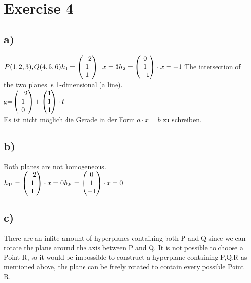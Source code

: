 \documentclass[a4paper,10pt]{article}
\begin{document}
\section*{Exercise 4}
\subsection*{a)} 
$P(1,2,3),Q(4,5,6) \\ \\
h_1=  \begin{pmatrix}-2\\1\\1 \end{pmatrix} \cdot x=3 \\\\
h_2=  \begin{pmatrix}0\\1\\-1 \end{pmatrix} \cdot x=-1 \\
$
The intersection of the two planes is 1-dimensional (a line). \\
g=$   \begin{pmatrix}-2\\1\\0 \end{pmatrix} + \begin{pmatrix}1\\1\\1 \end{pmatrix}  \cdot t \\$ \\
Es ist nicht möglich die Gerade in der Form $a\cdot x =b$ zu schreiben.
\subsection*{b)}
Both planes are not homogeneous. \\
$h_{1'}=  \begin{pmatrix}-2\\1\\1 \end{pmatrix} \cdot x = 0 \\
h_{2'}=  \begin{pmatrix}0\\1\\-1 \end{pmatrix} \cdot x = 0 \\ $
\subsection*{c)}
There are an infite amount of hyperplanes containing both P and Q since we can rotate the plane around the axis between P and Q. It is not possible to choose a Point R, so it would be impossible to construct a hyperplane containing P,Q,R as mentioned above, the plane can be freely rotated to contain every possible Point R.  
\end{document}
